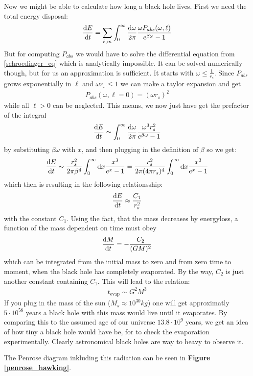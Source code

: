 	Now we might be able to calculate how long a black hole lives.
	First we need the total energy disposal:
	\begin{align}
		\frac{\mathrm{d} E}{\mathrm{d} t} =
		\sum_{\ell, m} \int_{0}^{\infty} \frac{\mathrm{d} \omega}{2 \pi}
		\frac{\omega P_{abs}(\omega,\ell)}{e^{\beta \omega} - 1}
	\end{align}
	But for computing $P_{abs}$ we would have to solve the differential equation from \eqref{schroedinger_eq} which is analytically impossible. It can be solved numerically though, but for us an approximation is sufficient. It starts with $\omega \leq \frac{1}{r_s}$. Since $P_{abs}$ grows exponentially in $\ell$ and $\omega r_s \leq 1$ we can make a taylor expansion and get
	\begin{align}
		P_ {abs}(\omega, \ell=0) = (\omega r_s)^2
	\end{align} 
	while all $\ell > 0$ can be neglected.
	This means, we now just have get the prefactor of the integral
	\begin{align}
		\frac{\mathrm{d} E}{\mathrm{d} t} \sim \int_{0}^{\infty} \frac{\mathrm{d} \omega}{2\pi} \frac{\omega^3 r_s^2}{e^{\beta \omega}-1}
	\end{align}
	by substituting $\beta \omega$ with $x$, and then plugging in the definition of $\beta$ so we get:
	\begin{align}
		\frac{\mathrm{d} E}{\mathrm{d} t} \sim \frac{r_s^2}{2 \pi \beta^4} \int_{0}^{\infty} \mathrm{d} x \frac{x^3}{e^{x}-1}
		= \frac{r_s^2}{2 \pi (4 \pi r_s)^4} \int_{0}^{\infty} \mathrm{d} x \frac{x^3}{e^{x}-1}
	\end{align}
	which then is resulting in the following relationsship:
	\begin{align}
		\frac{\mathrm{d} E}{\mathrm{d} t} \approx \frac{C_1}{r_s^2}
	\end{align}	
	with the constant $C_1$. Using the fact, that the mass decreases by energyloss, a function of the mass dependent on time must obey
	\begin{align}
		\frac{\mathrm{d} M}{\mathrm{d} t} = -\frac{C_2}{(GM)^2} 
	\end{align}		
	which can be integrated from the initial mass to zero and from zero time to moment, when the black hole has completely evaporated. By the way, $C_2$ is just another constant containing $C_1$. This will lead to the relation:
	\begin{align}
		t_{\text{evap}} \sim G^2 M^3
	\end{align}
	If you plug in the mass of the sun ($M_s \approx 10^{30} \unit{kg}$) one will get approximatly $5 \cdot 10^{58}$ years a black hole with this mass would live until it evaporates. By comparing this to the assumed age of our universe $13.8 \cdot 10^{9}$ years, we get an idea of how tiny a black hole would have be, for to check the evaporation experimentally. Clearly astronomical black holes are way to heavy to observe it.
	
	The Penrose diagram inkluding this radiation can be seen in \textbf{Figure \ref{penrose_hawking}}.
	\FloatBarrier

